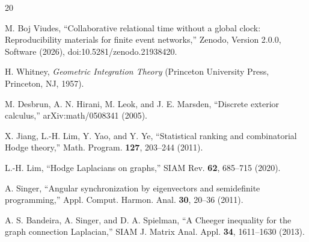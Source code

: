 \documentclass[aip,jmp,amsmath,amssymb,reprint]{revtex4-2}
\begin{document}
\begin{thebibliography}{20}

M. Boj Viudes, ``Collaborative relational time without a global clock: Reproducibility materials for finite event networks,'' Zenodo, Version 2.0.0, Software (2026), doi:10.5281/zenodo.21938420.

H. Whitney, \textit{Geometric Integration Theory} (Princeton University Press, Princeton, NJ, 1957).

M. Desbrun, A. N. Hirani, M. Leok, and J. E. Marsden, ``Discrete exterior calculus,'' arXiv:math/0508341 (2005).

X. Jiang, L.-H. Lim, Y. Yao, and Y. Ye, ``Statistical ranking and combinatorial Hodge theory,'' Math. Program. \textbf{127}, 203--244 (2011).

L.-H. Lim, ``Hodge Laplacians on graphs,'' SIAM Rev. \textbf{62}, 685--715 (2020).

A. Singer, ``Angular synchronization by eigenvectors and semidefinite programming,'' Appl. Comput. Harmon. Anal. \textbf{30}, 20--36 (2011).

A. S. Bandeira, A. Singer, and D. A. Spielman, ``A Cheeger inequality for the graph connection Laplacian,'' SIAM J. Matrix Anal. Appl. \textbf{34}, 1611--1630 (2013).

\end{thebibliography}
\end{document}
